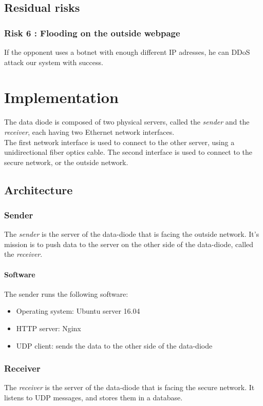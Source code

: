 \documentclass[a4paper,11pt]{article}
\begin{document}
\subsection{Residual risks}
\subsubsection{Risk 6 : Flooding on the outside webpage}
If the opponent uses a botnet with enough different IP adresses, he can DDoS attack our system with success.

\section{Implementation}
The data diode is composed of two physical servers, called the \textit{sender} and the \textit{receiver}, each having two Ethernet network interfaces.\\

The first network interface is used to connect to the other server, using a unidirectional fiber optics cable. The second interface is used to connect to the secure network, or the outside network.

\subsection{Architecture}
\subsubsection{Sender}
The \textit{sender} is the server of the data-diode that is facing the outside network. It's mission is to push data to the server on the other side of the data-diode, called the \textit{receiver}.

\paragraph{Software}
The sender runs the following software:
\begin{itemize}
	\item{Operating system: Ubuntu server 16.04}
	\item{HTTP server: Nginx}
	\item{UDP client: sends the data to the other side of the data-diode}
\end{itemize}

\subsubsection{Receiver}
The \textit{receiver} is the server of the data-diode that is facing the secure network. It listens to UDP messages, and stores them in a database.
\end{document}
